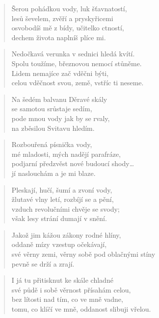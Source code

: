 \documentclass{book}
\begin{document}
\begin{verse}
Šerou pohádkou vody, luk šťavnatostí,\\
lesů ševelem, zvěří a pryskyřicemi\\
osvobodíš mě z bídy, učitelko ctností,\\
dechem života naplníš plíce mi.
\end{verse}
\begin{verse}
Nedočkavá verunka v sednici hledá kvítí.\\
Spolu toužíme, březnovou nemocí stůněme.\\
Lidem nemajíce zač vděčni býti,\\
celou vděčnost svou, země, vstříc ti neseme.
\end{verse}
\newpage
{}
\begin{verse}
Na šedém balvanu Děravé skály\\
se samotou srůstaje sedím,\\
pode mnou vody jak by se rvaly,\\
na zběsilou Svitavu hledím.
\end{verse}
\begin{verse}
Rozbouřená písnička vody,\\
mé mladosti, mých nadějí parafráze,\\
podjarní předzvěst nové budoucí shody\ldots\\
jí naslouchám a je mi blaze.
\end{verse}
\begin{verse}
Pleskají, hučí, šumí a zvoní vody,\\
žlutavé vlny letí, rozbíjí se a pění,\\
vzduch revolučními chvěje se svody;\\
však lesy strání dumají v snění.
\end{verse}
\begin{verse}
Jakož jim kážou zákony rodné hlíny,\\
oddaně mízy vzestup očekávají,\\
své věrny zemi, věrny sobě pod oblačnými stíny\\
pevně se drží a zrají.
\end{verse}
\begin{verse}
I já tu přitisknut ke skále chladné\\
své půdě i sobě věrnost přísahám celou,\\
bez lítosti nad tím, co ve mně vadne,\\
tomu, co klíčí ve mně, oddanost slibuji vřelou.
\end{verse}
\end{document}
